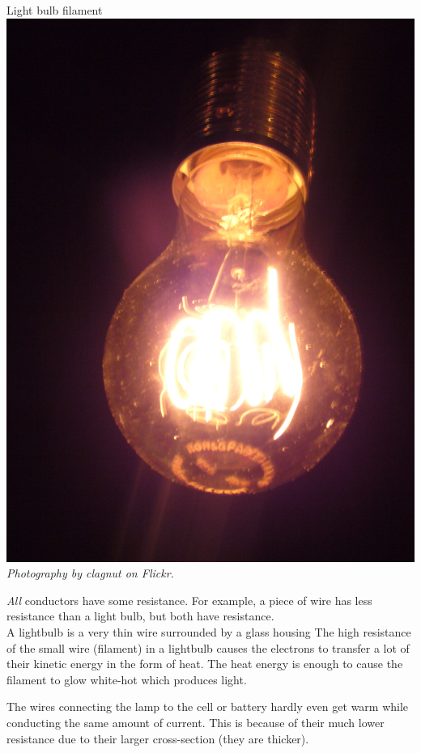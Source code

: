 \begin{minipage}{.5\textwidth}
\begin{center}
Light bulb filament\\
\includegraphics[width=.8\textwidth]{photos/lightbulb_by_clagnut.jpg}\\
\textit{Photography by clagnut on Flickr.}
\end{center}  
\end{minipage}
\begin{minipage}{.5\textwidth}

\textit{All} conductors have some resistance. For example, a piece of wire
has less resistance than a light bulb, but both have resistance. \\

A lightbulb is a very thin wire surrounded by a glass housing The high resistance of the small wire (filament) in a lightbulb causes the electrons to 
transfer a lot of their kinetic energy in the form of heat. The heat energy is enough
to cause the filament to glow white-hot which produces light.

\end{minipage}
The wires
connecting the lamp to the cell or battery hardly even get warm while
conducting the same amount of current. This is because of their
much lower resistance due to their larger cross-section (they are thicker).


